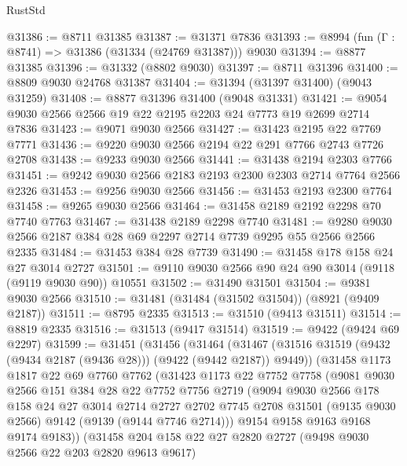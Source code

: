 \begin{lexlean}{RustStd}
\begin{coremodule}
@31386 := @8711 @31385
@31387 := @31371 @7836
@31393 := @8994 (fun (Γ : @8741) => @31386 (@31334 (@24769 @31387))) @9030
@31394 := @8877 @31385
@31396 := @31332 (@8802 @9030)
@31397 := @8711 @31396
@31400 := @8809 @9030 @24768 @31387
@31404 := @31394 (@31397 @31400) (@9043 @31259)
@31408 := @8877 @31396 @31400 (@9048 @31331)
@31421 := @9054 @9030 @2566 @2566 @19 @22 @2195 @2203 @24 @7773 @19 @2699 @2714 @7836
@31423 := @9071 @9030 @2566
@31427 := @31423 @2195 @22 @7769 @7771
@31436 := @9220 @9030 @2566 @2194 @22 @291 @7766 @2743 @7726 @2708
@31438 := @9233 @9030 @2566
@31441 := @31438 @2194 @2303 @7766
@31451 := @9242 @9030 @2566 @2183 @2193 @2300 @2303 @2714 @7764 @2566 @2326
@31453 := @9256 @9030 @2566
@31456 := @31453 @2193 @2300 @7764
@31458 := @9265 @9030 @2566
@31464 := @31458 @2189 @2192 @2298 @70 @7740 @7763
@31467 := @31438 @2189 @2298 @7740
@31481 := @9280 @9030 @2566 @2187 @384 @28 @69 @2297 @2714 @7739 @9295 @55 @2566 @2566 @2335
@31484 := @31453 @384 @28 @7739
@31490 := @31458 @178 @158 @24 @27 @3014 @2727
@31501 := @9110 @9030 @2566 @90 @24 @90 @3014 (@9118 (@9119 @9030 @90)) @10551
@31502 := @31490 @31501
@31504 := @9381 @9030 @2566
@31510 := @31481 (@31484 (@31502 @31504)) (@8921 (@9409 @2187))
@31511 := @8795 @2335
@31513 := @31510 (@9413 @31511)
@31514 := @8819 @2335
@31516 := @31513 (@9417 @31514)
@31519 := @9422 (@9424 @69 @2297)
@31599 := @31451
    (@31456
      (@31464
        (@31467 (@31516 @31519 (@9432 (@9434 @2187 (@9436 @28))) (@9422 (@9442 @2187)) @9449))
        (@31458
          @1173
          @1817
          @22
          @69
          @7760
          @7762
          (@31423
            @1173
            @22
            @7752
            @7758
            (@9081
              @9030
              @2566
              @151
              @384
              @28
              @22
              @7752
              @7756
              @2719
              (@9094
                @9030
                @2566
                @178
                @158
                @24
                @27
                @3014
                @2714
                @2727
                @2702
                @7745
                @2708
                @31501
                (@9135 @9030 @2566)
                @9142
                (@9139 (@9144 @7746 @2714)))
              @9154
              @9158
              @9163
              @9168
              @9174
              @9183))
          (@31458
            @204
            @158
            @22
            @27
            @2820
            @2727
            (@9498 @9030 @2566 @22 @203 @2820 @9613 @9617)

\end{coremodule}
\end{lexlean}
